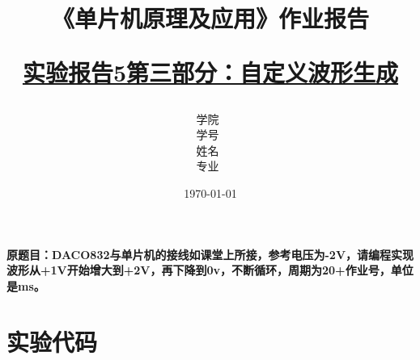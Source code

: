 \documentclass[12pt,hyperref,a4paper,UTF8]{ctexart}
\title{ 
        \vspace{1cm}
        \heiti \Huge \textbf{《单片机原理及应用》作业报告} \par
        \vspace{1cm} 
        \heiti \Large {\underline{实验报告5第三部分：自定义波形生成}   } 
        \vspace{3cm}
    
    }
\author{
        \vspace{0.5cm}
        \kaishu\Large 学院\ \dlmu[9cm]{卓越学院} \\ %
        \vspace{0.5cm}
        \kaishu\Large 学号\ \dlmu[9cm]{23040447} \\ %
        \vspace{0.5cm}
        \kaishu\Large 姓名\ \dlmu[9cm]{陈文轩} \qquad  \\ %
        \vspace{0.5cm}
        \kaishu\Large 专业\ \dlmu[9cm]{智能硬件与系统(电子信息工程)} \qquad \\ %
    }
\date{\today} %
\begin{document}
\cover
\thispagestyle{empty} %







\newpage
\setcounter{page}{1} %



\textbf{原题目：DACO832与单片机的接线如课堂上所接，参考电压为-2V，请编程实现波形从+1V开始增大到+2V，再下降到0v，不断循环，周期为20+作业号，单位是ms。}


\section{实验代码}
\end{document}
